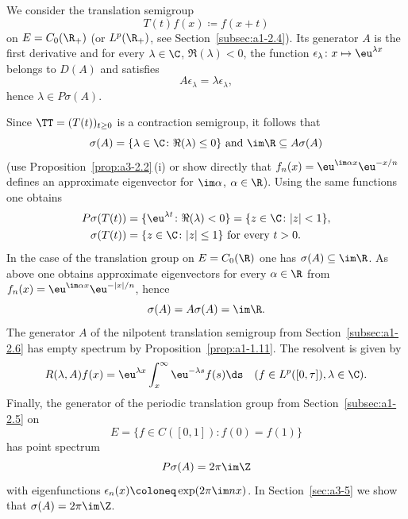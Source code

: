 \begin{example}\label{ex:a3-2.4}

We consider the translation semigroup
\[
T(t)f(x) \coloneq f(x+t)
\]
on $E = C_{0}(\R_{+})$ (or $L^{p}(\R_{+})$, see Section~\ref{subsec:a1-2.4}).
Its generator $A$ is the first derivative and for every $\lambda \in \C$, $\Re(\lambda) < 0$, the function $\epsilon_{\lambda} \colon x \mapsto \eu^{\lambda x}$ belongs to $D(A)$ and satisfies
\[
A\epsilon_{\lambda} = \lambda\epsilon_{\lambda} ,
\]
hence $\lambda \in P\sigma(A)$.

Since $\TT = (T(t))_{t \geq 0}$ is a contraction semigroup, it follows that 
%
\[
	 \text{$\sigma(A) = \{\lambda \in \C \colon \Re(\lambda) \leq 0\}$  and $\im\R \subseteq A\sigma(A)$}  
\]
%
(use Proposition~\ref{prop:a3-2.2}\,(i) or show directly that $f_{n}(x) = \eu^{ \im\alpha x}\eu^{-x/n}$ defines an approximate eigenvector for $\im\alpha$, $\alpha \in \R$).
Using the same functions one obtains
\begin{align*}
	P\sigma(T(t)) &= \{\eu^{\lambda t} \colon \Re(\lambda) < 0\} = \{z \in \C \colon |z| < 1\} ,\\
	\sigma(T(t)) &= \{z \in \C \colon |z| \leq 1\} \text{ for every } t > 0 .
\end{align*}
In the case of the translation group on $E = C_{0}(\R)$ one has $\sigma(A) \subseteq \im\R$.
As above one obtains approximate eigenvectors for every $\alpha \in \R$ from 
$f_{n}(x) = \eu^{\im\alpha x}\eu^{-|x|/n}$, hence
\[
\sigma(A) = A\sigma(A) = \im\R .
\]
The generator $A$ of the nilpotent translation semigroup from Section~\ref{subsec:a1-2.6} has empty spectrum by Proposition~\ref{prop:a1-1.11}.
The resolvent is given by
\[
R(\lambda,A)f(x) = \eu^{\lambda x}\int_{x}^{\infty}\eu^{-\lambda s}f(s)  \ds \quad (f \in L^{p}([0,\tau]), \lambda \in \C) .
\]
Finally, the generator of the periodic translation group from Section~\ref{subsec:a1-2.5} on
\[
	E = \{f \in C([0,1]) \colon f(0) = f(1)\}
\]
%
has point spectrum
\[
P\sigma(A) = 2\pi \im\Z
\]
with eigenfunctions $\epsilon_{n}(x) \coloneq \exp(2\pi \im n x)$.
In Section~\ref{sec:a3-5} we show that $\sigma(A) = 2\pi \im\Z$.
\end{example}
